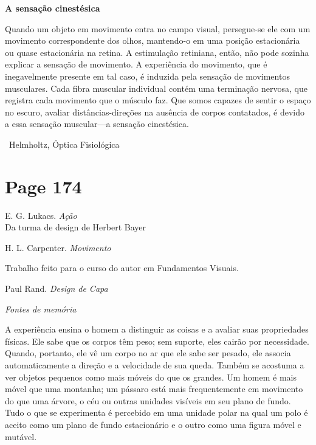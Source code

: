 \documentclass[a4paper]{article}
\begin{document}
\noindent\textbf{A sensação cinestésica}

Quando um objeto em movimento entra no campo visual, persegue-se ele com um movimento correspondente dos olhos, mantendo-o em uma posição estacionária ou quase estacionária na retina. A estimulação retiniana, então, não pode sozinha explicar a sensação de movimento. A experiência do movimento, que é inegavelmente presente em tal caso, é induzida pela sensação de movimentos musculares. Cada fibra muscular individual contém uma terminação nervosa, que registra cada movimento que o músculo faz. Que somos capazes de sentir o espaço no escuro, avaliar distâncias-direções na ausência de corpos contatados, é devido a essa sensação muscular---a sensação cinestésica.

\noindent\quad\textbullet\ Helmholtz, Óptica Fisiológica

\vspace*{\fill}
\par

\newpage
\section*{Page 174}

\raggedright

\noindent E. G. Lukacs. \textit{Ação} \\
\small Da turma de design de Herbert Bayer \par
\vspace{1cm}

\noindent H. L. Carpenter. \textit{Movimento} \textbullet \par
\small \textbullet Trabalho feito para o curso do autor em Fundamentos Visuais. \par
\vspace{1cm}

\noindent Paul Rand. \textit{Design de Capa} \par
\vspace{1.5cm}

\noindent \textit{Fontes de memória} \par
\vspace{0.5cm}

A experiência ensina o homem a distinguir as coisas e a avaliar suas propriedades físicas. Ele sabe que os corpos têm peso; sem suporte, eles cairão por necessidade. Quando, portanto, ele vê um corpo no ar que ele sabe ser pesado, ele associa automaticamente a direção e a velocidade de sua queda. Também se acostuma a ver objetos pequenos como mais móveis do que os grandes. Um homem é mais móvel que uma montanha; um pássaro está mais frequentemente em movimento do que uma árvore, o céu ou outras unidades visíveis em seu plano de fundo. Tudo o que se experimenta é percebido em uma unidade polar na qual um polo é aceito como um plano de fundo estacionário e o outro como uma figura móvel e mutável. \par
\end{document}
